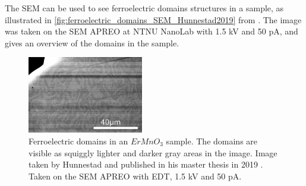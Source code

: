 The SEM can be used to see ferroelectric domains structures in a sample, as illustrated in \autoref{fig:ferroelectric_domains_SEM_Hunnestad2019} from \cite{hunnestad_visualizing_2019}.
The image was taken on the SEM APREO at NTNU NanoLab with 1.5 kV and 50 pA, and gives an overview of the domains in the sample.


\begin{figure}[ht]
    \centering
    \includegraphics[width=0.45\textwidth]{figures/ferroelectric_domains_SEM_Hunnestad2019.jpg}
    \caption{
        Ferroelectric domains in an $ErMnO_3$ sample.
        The domains are visible as squiggly lighter and darker gray areas in the image.
        Image taken by Hunnestad and published in his master thesis in 2019 \cite{hunnestad_visualizing_2019}.
        Taken on the SEM APREO with EDT, 1.5 kV and 50 pA.
    }
    \label{fig:ferroelectric_domains_SEM_Hunnestad2019}
\end{figure}
